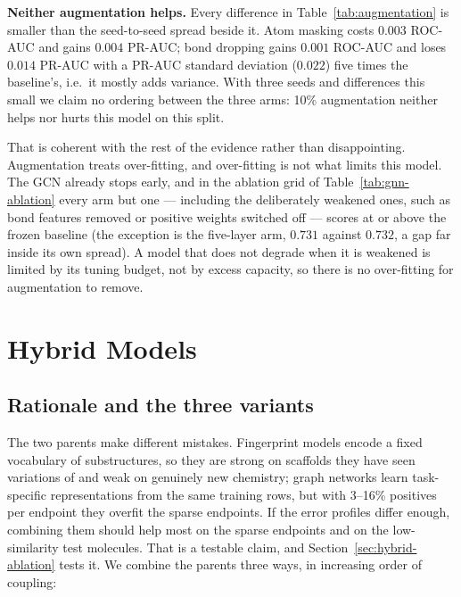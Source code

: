 \documentclass[conference]{IEEEtran}
\begin{document}
\textbf{Neither augmentation helps.} Every difference in Table~\ref{tab:augmentation} is smaller
than the seed-to-seed spread beside it. Atom masking costs $0.003$ ROC-AUC and gains $0.004$
PR-AUC; bond dropping gains $0.001$ ROC-AUC and loses $0.014$ PR-AUC with a PR-AUC standard
deviation ($0.022$) five times the baseline's, i.e.\ it mostly adds variance. With three seeds and
differences this small we claim no ordering between the three arms: 10\% augmentation neither
helps nor hurts this model on this split.

That is coherent with the rest of the evidence rather than disappointing. Augmentation treats
over-fitting, and over-fitting is not what limits this model. The GCN already stops early, and in
the ablation grid of Table~\ref{tab:gnn-ablation} every arm but one --- including the
deliberately weakened ones, such as bond features removed or positive weights switched off ---
scores at or above the frozen baseline (the exception is the five-layer arm, $0.731$ against
$0.732$, a gap far inside its own spread). A model that does not degrade when it is weakened is
limited by its tuning budget, not by excess capacity, so there is no over-fitting for
augmentation to remove.

\section{Hybrid Models}
\label{sec:hybrid}
\subsection{Rationale and the three variants}
The two parents make different mistakes. Fingerprint models encode a fixed vocabulary of
substructures, so they are strong on scaffolds they have seen variations of and weak on
genuinely new chemistry; graph networks learn task-specific representations from the same
training rows, but with 3--16\% positives per endpoint they overfit the sparse endpoints. If the
error profiles differ enough, combining them should help most on the sparse endpoints and on the
low-similarity test molecules. That is a testable claim, and
Section~\ref{sec:hybrid-ablation} tests it. We combine the parents three ways, in increasing
order of coupling:
\end{document}

